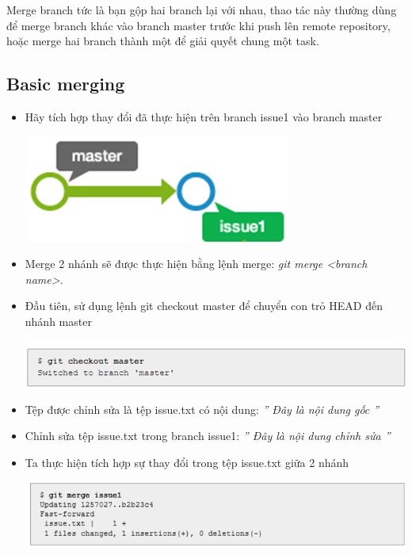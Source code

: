 \documentclass[12pt,a4paper]{report}
\begin{document}
Merge branch tức là bạn gộp hai branch lại với nhau, thao tác này thường dùng để merge branch khác vào branch master trước khi push lên remote repository, hoặc merge hai branch thành một để giải quyết chung một task.	
\subsection{Basic merging}
\begin{itemize}
 \item Hãy tích hợp thay đổi đã thực hiện trên branch issue1 vào branch master

	\includegraphics[width=0.8\linewidth]{screenshot060}

	\label{fig:screenshot060}	

\item Merge 2 nhánh sẽ được thực hiện bằng lệnh merge: {\it git merge <branch name>.}
\item Đầu tiên, sử dụng lệnh git checkout master để chuyển con trỏ HEAD đến nhánh master	

	\includegraphics[width=0.8\linewidth]{screenshot061}

	\label{fig:screenshot061}

\item Tệp được chỉnh sửa là tệp issue.txt có nội dung: {\it ''  Đây là nội dung gốc ''}	
\item Chỉnh sửa tệp issue.txt trong branch issue1: {\it '' Đây là nội dung chỉnh sửa ''}
\item Ta thực hiện tích hợp sự thay đổi trong tệp issue.txt giữa 2 nhánh

	\includegraphics[width=0.8\linewidth]{screenshot01}


\end{itemize}
\end{document}

